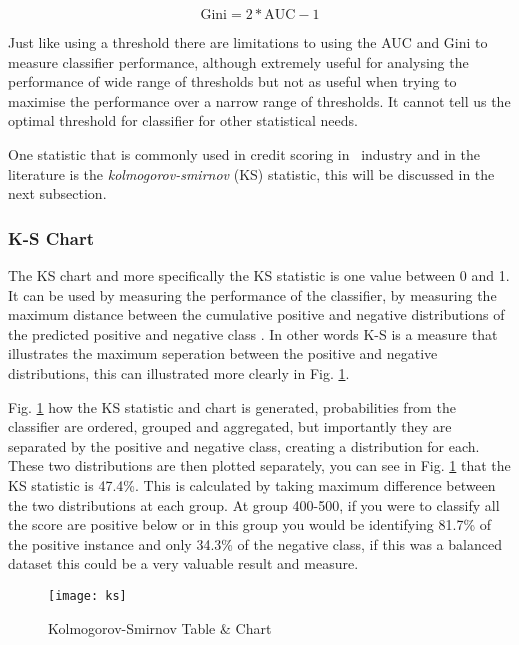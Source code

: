\begin{equation} \label{eq:gini}
\text{Gini} = 2*\text{AUC} - 1
\end{equation}

Just like using a threshold there are limitations to using the AUC and Gini to measure classifier performance, although extremely useful for analysing the performance of wide range of thresholds but not as useful when trying to maximise the performance over a narrow range of thresholds. It cannot tell us the optimal threshold for classifier for  other statistical needs.

One statistic that is commonly used in credit scoring in \subjectname\, industry and in the literature is the \textit{kolmogorov-smirnov} (KS) statistic, this will be discussed in the next subsection.
	

\subsubsection{K-S Chart}\label{subsub:ks}
The KS chart and more specifically the KS statistic is one value between 0 and 1. It can be used by measuring the performance of the classifier, by measuring the maximum distance between the cumulative positive and negative distributions of the predicted positive and negative class \citep{seliya_study_2009}. In other words K-S is a measure that illustrates the maximum seperation between the positive and negative distributions, this can illustrated more clearly in Fig. \ref{fig:ks}.

Fig. \ref{fig:ks} how the KS statistic and chart is generated, probabilities from the classifier are ordered, grouped and aggregated, but importantly they are separated by the positive and negative class, creating a distribution for each. These two distributions are then plotted separately, you can see in Fig. \ref{fig:ks} that the KS statistic is 47.4\%. This is calculated by taking maximum difference between the two distributions at each group. At group 400-500, if you were to classify all the score are positive below or in this group you would be identifying 81.7\% of the positive instance and only 34.3\% of the negative class, if this was a balanced dataset this could be a very valuable result and measure. 

\begin{figure}[H]
	\texttt{[image: ks]}
	\caption[Kolmogorov-Smirnov chart ]
	{Kolmogorov-Smirnov Table \& Chart }
	\label{fig:ks}
\end{figure}

